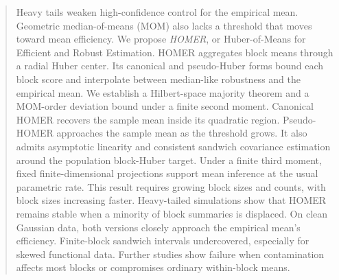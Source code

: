 \documentclass[twoside]{article}
\theoremstyle{definition}
\begin{document}
%
\runningtitle{ }

%
\runningauthor{ }

\twocolumn[

\aistatstitle{HOMER: Huber-of-Means for Efficient and Robust Estimation in Hilbert Spaces}

\aistatsauthor{ Kisung You \And Boram Cho}
\aistatsaddress{ Baruch College \And Yale University} ]

\begin{abstract}
Heavy tails weaken high-confidence control for the empirical mean. Geometric median-of-means (MOM) also lacks a threshold that moves toward mean efficiency. We propose \emph{HOMER}, or Huber-of-Means for Efficient and Robust Estimation. HOMER aggregates block means through a radial Huber center. Its canonical and pseudo-Huber forms bound each block score and interpolate between median-like robustness and the empirical mean. We establish a Hilbert-space majority theorem and a MOM-order deviation bound under a finite second moment. Canonical HOMER recovers the sample mean inside its quadratic region. Pseudo-HOMER approaches the sample mean as the threshold grows. It also admits asymptotic linearity and consistent sandwich covariance estimation around the population block-Huber target. Under a finite third moment, fixed finite-dimensional projections support mean inference at the usual parametric rate. This result requires growing block sizes and counts, with block sizes increasing faster. Heavy-tailed simulations show that HOMER remains stable when a minority of block summaries is displaced. On clean Gaussian data, both versions closely approach the empirical mean's efficiency. Finite-block sandwich intervals undercovered, especially for skewed functional data. Further studies show failure when contamination affects most blocks or compromises ordinary within-block means.
\end{abstract}

\end{document}
